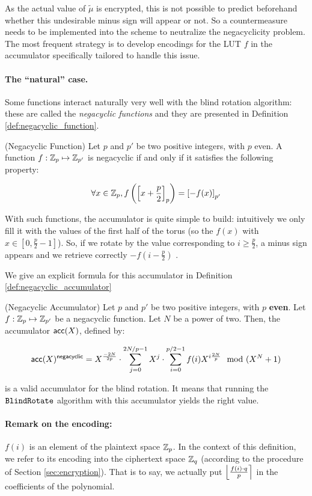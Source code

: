 As the actual value of $\tilde{\mu}$ is encrypted, this is not possible to predict beforehand whether this undesirable minus sign will appear or not. So a countermeasure needs to be implemented into the scheme to neutralize the negacyclicity problem. The most frequent strategy is to develop encodings for the \gls{LUT} $f$ in the accumulator specifically tailored to handle this issue.


\paragraph{The ``natural'' case.}

Some functions interact naturally very well with the blind rotation algorithm: these are called the \textit{negacyclic functions} and they are presented in Definition \ref{def:negacyclic_function}.


\begin{definition} (Negacyclic Function)
	Let $p$ and $p'$ be two positive integers, with $p$ even. A function $f : \mathbb{Z}_p \mapsto \mathbb{Z}_{p'}$ is negacyclic if and only if it satisfies the following property:
	
	\[
		\forall x \in \mathbb{Z}_p, f\left (\left [ x + \frac p 2 \right ]_{p} \right ) = \left [ -f(x) \right ]_{p'}
	\]
	
	\label{def:negacyclic_function}
\end{definition}


With such functions, the accumulator is quite simple to build: intuitively we only fill it with the values of the first half of the torus (so the $f(x)$ with $x \in \left [0, \frac p 2 - 1 \right ]$). So, if we rotate by the value corresponding to $i \ge \frac p 2$, a minus sign appears and we retrieve correctly $-f\left(i - \frac p 2 \right)$ .

We give an explicit formula for this accumulator in Definition \ref{def:negacyclic_accumulator}

\begin{definition} (Negacyclic Accumulator)
		\label{def:negacyclic_accumulator}
		Let $p$ and $p'$ be two positive integers, with $p$ \textbf{even}. Let $f:\mathbb{Z}_p \mapsto \mathbb{Z}_{p'}$ be a negacyclic function. Let $N$ be a power of two. Then, the accumulator $\textsf{acc}(X)$, defined by:
	
	\[
		\textsf{acc}(X)^{\textsf{negacyclic}} = X^{\frac{-2N}{2p}} \cdot \sum_{j=0}^{2N / p - 1} X^j \cdot \sum_{i=0}^{p/2 - 1} f(i) X^{i \frac{2N}{p}} \mod (X^N + 1)
	\]
	
\noindent is a valid accumulator for the blind rotation. It means that running the $\texttt{BlindRotate}$ algorithm with this accumulator yields the right value.
	
	\paragraph{Remark on the encoding:}
	$f(i)$ is an element of the plaintext space $\mathbb{Z}_p$. In the context of this definition, we refer to its encoding into the ciphertext space $\mathbb{Z}_q$ (according to the procedure of Section \ref{sec:encryption}). That is to say, we actually put $\left \lfloor \frac{f(i) \cdot q}{p} \right \rceil$ in the coefficients of the polynomial.
\end{definition}



